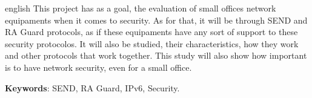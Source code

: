 \begin{resumo}[ABSTRACT]
 \begin{otherlanguage*}{english}
   This project has as a goal, the evaluation of small offices network equipaments when it comes to security. As for that, it will be through SEND and RA Guard protocols, as if these equipaments have any sort of support to these security protocolos. It will also be studied, their characteristics, how they work and other protocols that work together. This study will also show how important is to have network security, even for a small office.
   
   
   \vspace{\onelineskip}
 
   \noindent 
   \textbf{Keywords}: SEND, RA Guard, IPv6, Security.
 \end{otherlanguage*}
\end{resumo}
